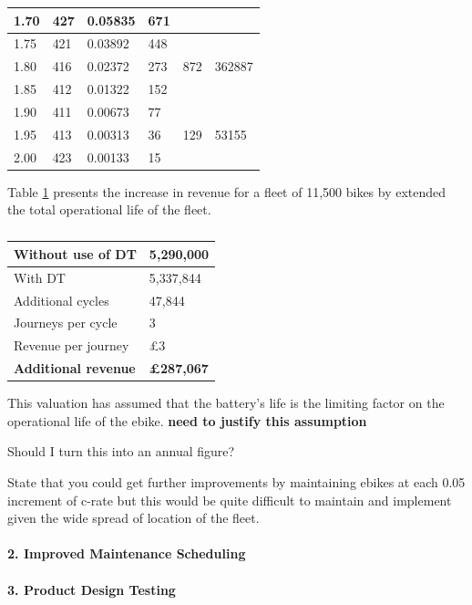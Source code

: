\documentclass[a4paper, 10pt]{article}
\numberwithin{equation}{section}
\begin{document}
\begin{table}[H]
\begin{tabular}{|l|l|l|l|l|l|}
\rowcolor[HTML]{C0C0C0} 
1.70   & 427                 & 0.05835     & 671             &               &                       \\ \hline
1.75   & 421                 & 0.03892     & 448             &               &                       \\ \hline
1.80   & 416                 & 0.02372     & 273             & 872           & 362887                \\ \hline
1.85   & 412                 & 0.01322     & 152             &               &                       \\ \hline
\rowcolor[HTML]{C0C0C0} 
1.90   & 411                 & 0.00673     & 77              &               &                       \\ \hline
\rowcolor[HTML]{C0C0C0} 
1.95   & 413                 & 0.00313     & 36              & 129           & 53155                 \\ \hline
\rowcolor[HTML]{C0C0C0} 
2.00   & 423                 & 0.00133     & 15              &               &                       \\ \hline
\end{tabular}
\end{table}

Table \ref{tab:value_life} presents the increase in revenue for a fleet of 11,500 bikes by extended the total operational life of the fleet.

\begin{table}[H]
\centering
\caption{}
\label{tab:value_life}
\begin{tabular}{|l|l|}
\hline
Without use of DT   & 5,290,000 \\ \hline
With DT             & 5,337,844 \\ \hline
Additional cycles   & 47,844   \\ \hline
Journeys per cycle  & 3       \\ \hline
Revenue per journey & £3      \\ \hline
\textbf{Additional revenue}  & \textbf{£287,067} \\ \hline
\end{tabular}
\end{table}

This valuation has assumed that the battery's life is the limiting factor on the operational life of the ebike. \textbf{need to justify this assumption}


Should I turn this into an annual figure?

State that you could get further improvements by maintaining ebikes at each 0.05 increment of c-rate but this would be quite difficult to maintain and implement given the wide spread of location of the fleet.
\\
\\
\textbf{2. Improved Maintenance Scheduling}
\\
\\
\textbf{3. Product Design Testing}
\end{document}
